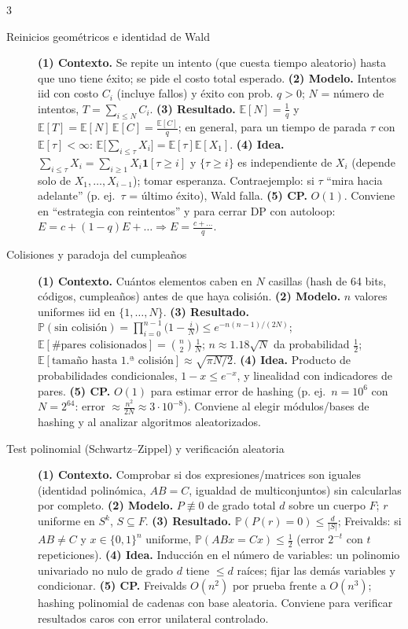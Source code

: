 \documentclass[8pt, spanish, mexico, letterpaper]{extarticle}
\newcommand{\E}{\mathbb{E}}
\newcommand{\Prob}{\mathbb{P}}
\newcommand{\<}{<}
\begin{document}
\begin{multicols*}{3}
\begin{description}
\item[Reinicios geom\'etricos e identidad de Wald] \textbf{(1) Contexto.} Se repite un intento (que cuesta tiempo aleatorio) hasta que uno tiene \'exito; se pide el costo total esperado. \textbf{(2) Modelo.} Intentos iid con costo $C_i$ (incluye fallos) y \'exito con prob. $q>0$; $N$ = n\'umero de intentos, $T=\sum_{i\le N}C_i$. \textbf{(3) Resultado.} $\E[N]=\frac1q$ y $\E[T]=\E[N]\,\E[C]=\frac{\E[C]}{q}$; en general, para un tiempo de parada $\tau$ con $\E[\tau]<\infty$: $\E\bigl[\sum_{i\le\tau}X_i\bigr]=\E[\tau]\E[X_1]$. \textbf{(4) Idea.} $\sum_{i\le\tau}X_i=\sum_{i\ge1}X_i\mathbf 1[\tau\ge i]$ y $\{\tau\ge i\}$ es independiente de $X_i$ (depende solo de $X_1,\dots,X_{i-1}$); tomar esperanza. Contraejemplo: si $\tau$ ``mira hacia adelante'' (p. ej.\ $\tau$ = \'ultimo \'exito), Wald falla. \textbf{(5) CP.} $O(1)$. Conviene en ``estrategia con reintentos'' y para cerrar DP con autoloop: $E=c+(1 - q)E+\dots\Rightarrow E=\frac{c+\dots}{q}$.

\item[Colisiones y paradoja del cumplea\~nos] \textbf{(1) Contexto.} Cu\'antos elementos caben en $N$ casillas (hash de 64 bits, c\'odigos, cumplea\~nos) antes de que haya colisi\'on. \textbf{(2) Modelo.} $n$ valores uniformes iid en $\{1,\dots,N\}$. \textbf{(3) Resultado.} $\Prob(\text{sin colisi\'on})=\prod_{i=0}^{n-1}\bigl(1-\frac iN\bigr)\le e^{-n(n-1)/(2N)}$; $\E[\#\text{pares colisionados}]=\binom n2\frac1N$; $n\approx1.18\sqrt N$ da probabilidad $\tfrac12$; $\E[\text{tama\~no hasta 1.ª colisi\'on}]\approx\sqrt{\pi N/2}$. \textbf{(4) Idea.} Producto de probabilidades condicionales, $1-x\le e^{-x}$, y linealidad con indicadores de pares. \textbf{(5) CP.} $O(1)$ para estimar error de hashing (p. ej.\ $n=10^6$ con $N=2^{64}$: error $\approx\frac{n^2}{2N}\approx3\cdot10^{-8}$). Conviene al elegir m\'odulos/bases de hashing y al analizar algoritmos aleatorizados.

\item[Test polinomial (Schwartz--Zippel) y verificaci\'on aleatoria] \textbf{(1) Contexto.} Comprobar si dos expresiones/matrices son iguales (identidad polin\'omica, $AB=C$, igualdad de multiconjuntos) sin calcularlas por completo. \textbf{(2) Modelo.} $P\not\equiv0$ de grado total $d$ sobre un cuerpo $F$; $r$ uniforme en $S^k$, $S\subseteq F$. \textbf{(3) Resultado.} $\Prob(P(r)=0)\le\frac d{|S|}$; Freivalds: si $AB\ne C$ y $x\in\{0,1\}^n$ uniforme, $\Prob(ABx=Cx)\le\frac12$ (error $2^{-t}$ con $t$ repeticiones). \textbf{(4) Idea.} Inducci\'on en el n\'umero de variables: un polinomio univariado no nulo de grado $d$ tiene $\le d$ ra\'ices; fijar las dem\'as variables y condicionar. \textbf{(5) CP.} Freivalds $O(n^2)$ por prueba frente a $O(n^3)$; hashing polinomial de cadenas con base aleatoria. Conviene para verificar resultados caros con error unilateral controlado.


\end{description}
\end{multicols*}
\end{document}
